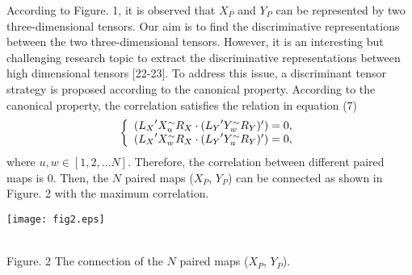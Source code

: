 \documentclass[journal]{IEEEtran}
\begin{document}
According to Figure. 1, it is observed that $X_P$ and $Y_P$ can be represented by two three-dimensional tensors. Our aim is to find the discriminative representations between the two three-dimensional tensors. However, it is an interesting but challenging research topic to extract the discriminative representations between high dimensional tensors [22-23]. To address this issue, a discriminant tensor strategy is proposed according to the canonical property. According to the canonical property, the correlation satisfies the relation in equation (7)
\begin{equation}
\left\{ \begin{array}{l}
 {\rm{}}({L_{{X}}}^\prime {X^\sim_u}{R_{{X}}} \cdot ({L_{{Y}}}^\prime {Y^\sim_w}{R_{{Y}}})^\prime) = 0, \\
 {\rm{}}({L_{{X}}}^\prime {X^\sim_w}{R_{{X}}} \cdot ({L_{{Y}}}^\prime {Y^\sim_u}{R_{{Y}}})^\prime) = 0, \\
 \end{array} \right.
\end{equation}
where $u,w \in [1,2,...N]$. Therefore, the correlation between different paired maps is 0. Then, the $N$ paired maps ($X_P$, $Y_P$) can be connected as shown in Figure. 2 with the maximum correlation.\\
\centerline{\texttt{[image: fig2.eps]}}\\ {Figure. 2 The connection of the $N$ paired maps ($X_P$, $Y_P$).}\\\indent
\end{document}
